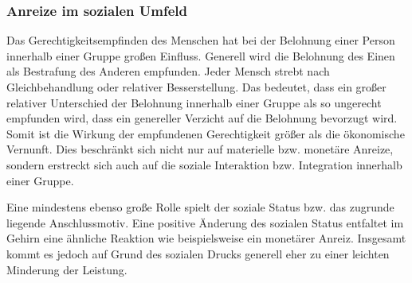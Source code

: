 \subsubsection{Anreize im sozialen Umfeld}
\label{sec:AnreizeImSozialenUmfeld}
Das Gerechtigkeitsempfinden des Menschen hat bei der Belohnung einer Person innerhalb einer Gruppe großen Einfluss. Generell wird die Belohnung des Einen als Bestrafung des Anderen empfunden. Jeder Mensch strebt nach Gleichbehandlung oder relativer Besserstellung. Das bedeutet, dass ein großer relativer Unterschied der Belohnung innerhalb einer Gruppe als so ungerecht empfunden wird, dass ein genereller Verzicht auf die Belohnung bevorzugt wird. Somit ist die Wirkung der empfundenen Gerechtigkeit größer als die ökonomische Vernunft. Dies beschränkt sich nicht nur auf materielle bzw. monetäre Anreize, sondern erstreckt sich auch auf die soziale Interaktion bzw. Integration innerhalb einer Gruppe. \citep[S. 81ff]{Nowka.2013}
 
Eine mindestens ebenso große Rolle spielt der soziale Status bzw. das zugrunde liegende Anschlussmotiv. Eine positive Änderung des sozialen Status entfaltet im Gehirn eine ähnliche Reaktion wie beispielsweise ein monetärer Anreiz. Insgesamt kommt es jedoch auf Grund des sozialen Drucks generell eher zu einer leichten Minderung der Leistung. \citep[S. 84]{Nowka.2013}
\newpage